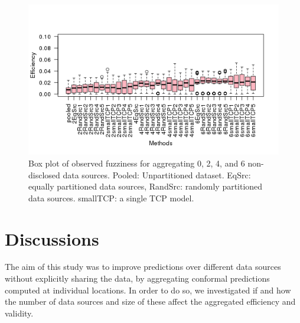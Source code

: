 \documentclass[main]{subfiles}
\begin{document}


\begin{figure}[H]
\begin{center}


 
  \includegraphics[scale=0.8]{images/boxplotCombined_eff}
\caption{Box plot of observed fuzziness for aggregating 0, 2, 4, and 6 non-disclosed data sources. Pooled: Unpartitioned dataset. EqSrc: equally partitioned data sources, RandSrc: randomly partitioned data sources. smallTCP: a single TCP model.}
\label{fig:boxplotCombined}
\end{center}
\end{figure}




\section{Discussions}
The aim of this study was to improve predictions over different data sources without explicitly sharing the data, by aggregating conformal predictions computed at individual locations. In order to do so, we investigated if and how the number of data sources and size of these affect the aggregated efficiency and validity.
\end{document}
